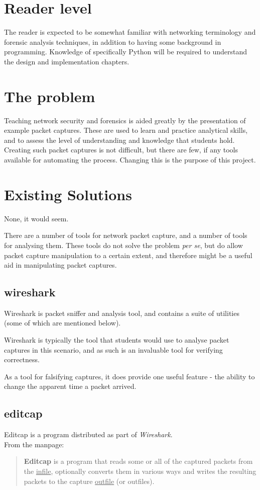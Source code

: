 \documentclass[10pt,a4paper,notitlepage]{report}
\begin{document}
\section{Reader level}
The reader is expected to be somewhat familiar with networking terminology and forensic analysis techniques, in addition to having some background in programming. Knowledge of specifically Python will be required to understand the design and implementation chapters.

\section{The problem}
Teaching network security and forensics is aided greatly by the presentation of example packet captures. These are used to learn and practice analytical skills, and to assess the level of understanding and knowledge that students hold.
Creating such packet captures is not difficult, but there are few, if any tools available for automating the process. Changing this is the purpose of this project.

\pagebreak

\section{Existing Solutions}
\label{sec:existing}
None, it would seem.

There are a number of tools for network packet capture, and a number of tools for analysing them. These tools do not solve the problem \emph{per se}, but do allow packet capture manipulation to a certain extent, and therefore might be a useful aid in manipulating packet captures.

\subsection{wireshark}
Wireshark is packet sniffer and analysis tool\cite{wireshark}, and contains a suite of utilities (some of which are mentioned below).

Wireshark is typically the tool that students would use to analyse packet captures in this scenario, and as such is an invaluable tool for verifying correctness.

As a tool for falsifying captures, it does provide one useful feature - the ability to change the apparent time a packet arrived.

\subsection{editcap}
Editcap is a program distributed as part of \emph{Wireshark}.\\
From the manpage\cite{editcap-man}:
\begin{quote}
\textbf{Editcap} is a program that reads some or all of the captured packets from the \underline{infile}, optionally converts them in various ways and writes the resulting packets to the capture \underline{outfile} (or outfiles).
\end{quote}
\end{document}
